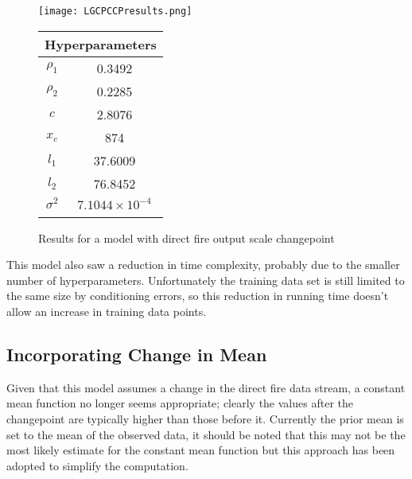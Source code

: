 \documentclass[a4paper,11pt]{report}
\begin{document}

  \begin{figure}[!ht]
    \centering
    \texttt{[image: LGCPCCPresults.png]}
    \qquad
    \doublespacing
    \begin{tabular}[b]{cc}
    \multicolumn{2}{c}{\textbf{Hyperparameters}}                                            \\ \hline
      \(\rho_1\)                    & 0.3492                \\                       
\(\rho_2\)                     & 0.2285                           \\            
\(c\)                               & 2.8076                                      \\ 
\(x_c\)                        & 874                                         \\ 
\(l_1\)                               & 37.6009                                      \\  
\(l_2\) & 76.8452 \\ 
\(\sigma^2\) & \(7.1044 \times 10^{-4}\) \\ 
& \\
    \end{tabular}
    \captionsetup{labelformat=andtable}
    \caption{Results for a model with direct fire output scale changepoint}
  \end{figure}

This model also saw a reduction in time complexity, probably due to the smaller number of hyperparameters. Unfortunately the training data set is still limited to the same size by conditioning errors, so this reduction in running time doesn't allow an increase in training data points.

\subsection{Incorporating Change in Mean}

Given that this model assumes a change in the direct fire data stream, a constant mean function no longer seems appropriate; clearly the values after the changepoint are typically higher than those before it. Currently the prior mean is set to the mean of the observed data, it should be noted that this may not be the most likely estimate for the constant mean function but this approach has been adopted to simplify the computation. \par
\end{document}
